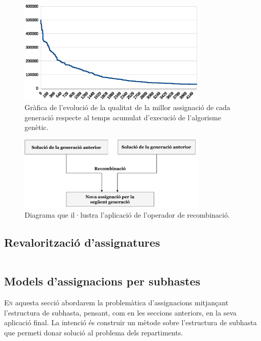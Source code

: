 \documentclass[10pt,twocolumn]{article}
\begin{document}
\begin{figure}[!]
	\centering
	\includegraphics[width=9cm]{progress_ga}
	\caption{ \small Gràfica de l'evolució de la qualitat de la millor assignació de cada generació respecte al temps acumulat d'execució de l'algorisme genètic. }
	\label{fio}
\end{figure}
\begin{figure}[ht]
	\centering
	\includegraphics[width=9cm]{recombinacio}
	\caption{ \small Diagrama que il·lustra l'aplicació de l'operador de recombinació. }
	\label{firo}
\end{figure}
\subsection{Revalorització d'assignatures}

\newpage
$$
$$

\newpage
\begin{tcolorbox}[colframe=white,colback=redviolet!20,sharp corners=all,size=minimal,halign=center,valign=center]
	\section{Models d'assignacions per subhastes}
\end{tcolorbox}
\lettrine{E}n aquesta secció abordarem la problemàtica d'assignacions mitjançant l'estructura de subhasta, pensant, com en les seccions anteriors, en la seva aplicació final. La intenció  és construir un mètode sobre l'estructura de subhasta que permeti  donar solució al problema dels repartiments.
\end{document}
